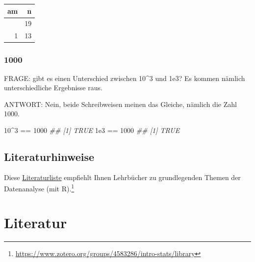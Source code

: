 \documentclass[
  a4paper,
]{scrbook}
\newenvironment{Shaded}{\begin{snugshade}}{\end{snugshade}}
\newcommand{\DecValTok}[1]{\textcolor[rgb]{0.68,0.00,0.00}{#1}}
\newcommand{\DocumentationTok}[1]{\textcolor[rgb]{0.37,0.37,0.37}{\textit{#1}}}
\newcommand{\FloatTok}[1]{\textcolor[rgb]{0.68,0.00,0.00}{#1}}
\newcommand{\SpecialCharTok}[1]{\textcolor[rgb]{0.37,0.37,0.37}{#1}}
\theoremstyle{definition}
\theoremstyle{definition}
\theoremstyle{definition}
\theoremstyle{remark}
\begin{document}
\begin{longtable}[]{@{}rr@{}}
\toprule\noalign{}
am & n \\
\midrule\noalign{}
\endhead
\bottomrule\noalign{}
\endlastfoot
0 & 19 \\
1 & 13 \\
\end{longtable}

\subsection{1000}\label{section-1}

FRAGE: gibt es einen Unterschied zwischen 10\^{}3 und 1e3? Es kommen
nämlich unterschiedliche Ergebnisse raus.

ANTWORT: Nein, beide Schreibweisen meinen das Gleiche, nämlich die Zahl
1000.

\begin{Shaded}
\begin{Highlighting}[]
\DecValTok{10}\SpecialCharTok{\^{}}\DecValTok{3} \SpecialCharTok{==} \DecValTok{1000} 
\DocumentationTok{\#\# [1] TRUE}
\FloatTok{1e3} \SpecialCharTok{==} \DecValTok{1000}
\DocumentationTok{\#\# [1] TRUE}
\end{Highlighting}
\end{Shaded}

\section{Literaturhinweise}\label{literaturhinweise-8}

Diese
\href{https://www.zotero.org/groups/4583286/intro-stats/library}{Literaturliste}
empfiehlt Ihnen Lehrbücher zu grundlegenden Themen der Datenanalyse (mit
R).\footnote{\url{https://www.zotero.org/groups/4583286/intro-stats/library}}

\chapter*{Literatur}\label{literatur}

\end{document}
